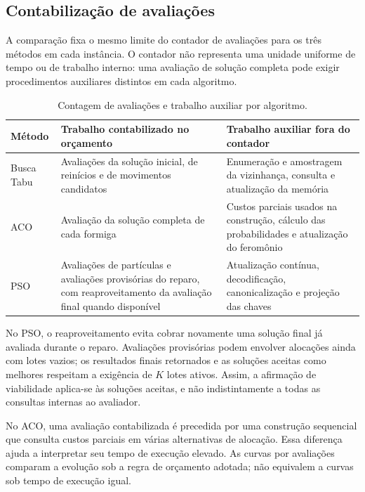 \documentclass[12pt,a4paper]{article}
\begin{document}
\subsection{Contabilização de avaliações}
\label{subsec:contagem}

A comparação fixa o mesmo limite do contador de avaliações para os três métodos em cada
instância. O contador não representa uma unidade uniforme de tempo ou de trabalho
interno: uma avaliação de solução completa pode exigir procedimentos auxiliares
distintos em cada algoritmo.

\begin{table}[htbp]
\centering\small
\caption{Contagem de avaliações e trabalho auxiliar por algoritmo.}
\label{tab:contagem}
\begin{tabularx}{\textwidth}{lYY}
\toprule
Método & Trabalho contabilizado no orçamento & Trabalho auxiliar fora do contador \\
\midrule
Busca Tabu & Avaliações da solução inicial, de reinícios e de movimentos candidatos & Enumeração e amostragem da vizinhança, consulta e atualização da memória \\
ACO & Avaliação da solução completa de cada formiga & Custos parciais usados na construção, cálculo das probabilidades e atualização do
feromônio \\
PSO & Avaliações de partículas e avaliações provisórias do reparo, com reaproveitamento da
avaliação final quando disponível & Atualização contínua, decodificação, canonicalização e projeção das chaves \\
\bottomrule
\end{tabularx}
\end{table}

No PSO, o reaproveitamento evita cobrar novamente uma solução final já avaliada durante
o reparo. Avaliações provisórias podem envolver alocações ainda com lotes vazios; os
resultados finais retornados e as soluções aceitas como melhores respeitam a exigência
de $K$ lotes ativos. Assim, a afirmação de viabilidade aplica-se às soluções aceitas, e
não indistintamente a todas as consultas internas ao avaliador.

No ACO, uma avaliação contabilizada é precedida por uma construção sequencial que
consulta custos parciais em várias alternativas de alocação. Essa diferença ajuda a
interpretar seu tempo de execução elevado. As curvas por avaliações comparam a evolução
sob a regra de orçamento adotada; não equivalem a curvas sob tempo de execução igual.
\end{document}
